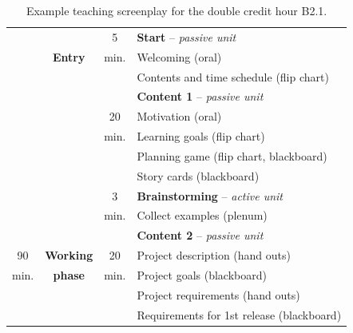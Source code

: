 \documentclass[conference]{IEEEtran}
\begin{document}
\begin{table}[!t]
  \renewcommand{\arraystretch}{1.3}
  \setlength{\tabcolsep}{0.6em}
  \caption{Example teaching screenplay for the double credit hour B2.1.}
  \label{tab:screenplay1}
  \centering
  \begin{tabular}{|c|c|c|l|}
    \hline
         &                  & 5    & \textbf{Start} -- \textit{passive unit} \\
         & \textbf{Entry}   & min. & \hspace{0.5em} Welcoming (oral) \\
         &                  &      & \hspace{0.5em} Contents and time schedule (flip chart) \\
    \cline{2-4}
         &                  &      & \textbf{Content 1} -- \textit{passive unit} \\
         &                  & 20   & \hspace{0.5em} Motivation (oral) \\
         &                  & min. & \hspace{0.5em} Learning goals (flip chart) \\
         &                  &      & \hspace{0.5em} Planning game (flip chart, blackboard) \\
         &                  &      & \hspace{0.5em} Story cards (blackboard)\\
    \cline{3-4}
         &                  & 3    & \textbf{Brainstorming} -- \textit{active unit} \\
         &                  & min. & \hspace{0.5em} Collect examples (plenum) \\
    \cline{3-4}
         &                  &      & \textbf{Content 2} -- \textit{passive unit} \\
    90   & \textbf{Working} & 20   & \hspace{0.5em} Project description (hand outs) \\
    min. & \textbf{phase}   & min. & \hspace{0.5em} Project goals (blackboard) \\
         &                  &      & \hspace{0.5em} Project requirements (hand outs) \\
         &                  &      & \hspace{0.5em} Requirements for 1st release (blackboard) \\

\end{tabular}
\end{table}
\end{document}
